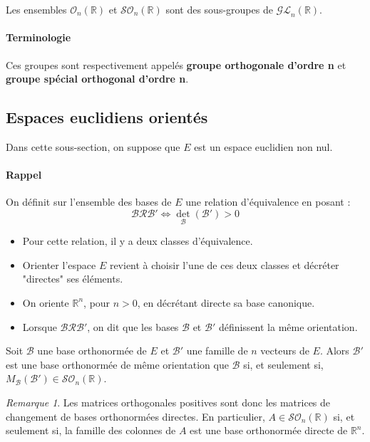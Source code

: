 \documentclass[french]{article}
\newcommand{\R}{\mathbb{R}}
\theoremstyle{plain}
\theoremstyle{definition}
\theoremstyle{remark}
\newtheorem*{rmq}{Remarque}
\begin{document}
\begin{thm}{}
	Les ensembles $\mathcal{O}_n(\R)$ et $\mathcal{SO}_n(\R)$ sont des sous-groupes de $\mathcal{GL}_n(\R)$.
\end{thm}

\paragraph{Terminologie} Ces groupes sont respectivement appelés \textbf{groupe orthogonale d'ordre n} et \textbf{groupe spécial orthogonal d'ordre n}.

\subsection{Espaces euclidiens orientés}

Dans cette sous-section, on suppose que $E$ est un espace euclidien non nul.

\paragraph{Rappel} On définit sur l'ensemble des bases de $E$ une relation d'équivalence en posant :
$$\mathcal{B}\mathcal{R}\mathcal{B}'\iff \det_\mathcal{B}(\mathcal{B}')>0$$
\begin{itemize}
	\item Pour cette relation, il y a deux classes d'équivalence.
	\item Orienter l'espace $E$ revient à choisir l'une de ces deux classes et décréter "directes" ses éléments.
	\item On oriente $\R^n$, pour $n>0$, en décrétant directe sa base canonique.
	\item Lorsque $\mathcal{B}\mathcal{R}\mathcal{B}'$, on dit que les bases $\mathcal{B}$ et $\mathcal{B}'$ définissent la même orientation.
\end{itemize}

\begin{thm}{}
	Soit $\mathcal{B}$ une base orthonormée de $E$ et $\mathcal{B}'$ une famille de $n$ vecteurs de $E$. Alors $\mathcal{B}'$ est une base orthonormée de même orientation que $\mathcal{B}$ si, et seulement si, $M_\mathcal{B}(\mathcal{B}')\in\mathcal{SO}_n(\R)$.
\end{thm}

\begin{rmq}
	Les matrices orthogonales positives sont donc les matrices de changement de bases orthonormées directes. En particulier, $A\in\mathcal{SO}_n(\R)$ si, et seulement si, la famille des colonnes de $A$ est une base orthonormée directe de $\R^n$.
\end{rmq}
\end{document}
